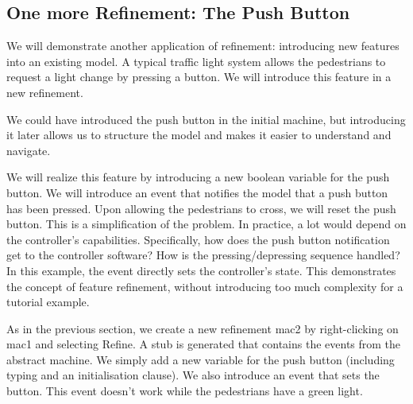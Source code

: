 {\begin{description}
\begin{description}
\begin{description}
			\end{description}
		\Witnesses
			\begin{description}
			\end{description}
		\ThenAct
			\begin{description}
			\nItemX{ act1 }{ cars\_colors :=  new\_value\_colors }
			\end{description}
		\EndAct
		\end{description}
\END
\end{description}
}

\subsection{One more Refinement: The Push Button}
\label{tut_one_more_refinement}

We will demonstrate another application of refinement: introducing new features into an existing model.  A typical traffic light system allows the pedestrians to request a light change by pressing a button.  We will introduce this feature in a new refinement.

We could have introduced the push button in the initial machine, but introducing it later allows us to structure the model and makes it easier to understand and navigate.

We will realize this feature by introducing a new boolean variable for the push button.  We will introduce an event that notifies the model that a push button has been pressed.  Upon allowing the pedestrians to cross, we will reset the push button.  This is a simplification of the problem.  In practice, a lot would depend on the controller's capabilities.  Specifically, how does the push button notification get to the controller software?  How is the pressing/depressing sequence handled?  In this example, the event directly sets the controller's state.  This demonstrates the concept of feature refinement, without introducing too much complexity for a tutorial example.

As in the previous section, we create a new refinement \textsf{mac2} by right-clicking on \textsf{mac1} and selecting \textsf{Refine}.  A stub is generated that contains the events from the abstract machine.  We simply add a new variable for the push button (including typing and an initialisation clause).  We also introduce an event that sets the button.  This event doesn't work while the pedestrians have a green light.

